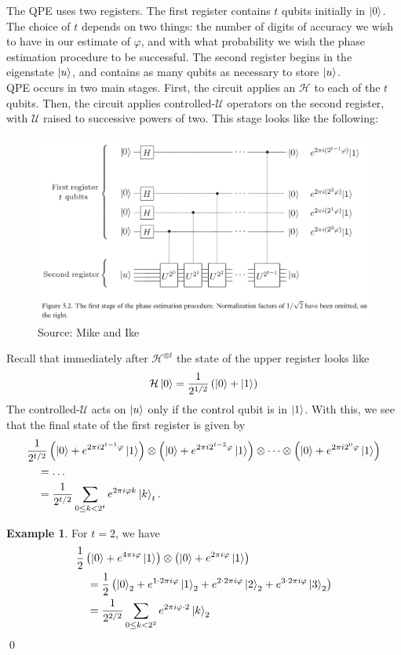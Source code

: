 \documentclass{book}
\theoremstyle{definition}
\newtheorem{exmp}{Example}[section]
\newcommand{\nn}{\nonumber}
\newcommand{\had}{\mathcal{H}}
\newcommand{\f}[2]{\frac{#1}{#2}}
\newcommand{\lp}{\left(}
\newcommand{\rp}{\right)}
\newcommand{\U}{\mathcal{U}}
\begin{document}
The QPE uses two registers. The first register contains $t$ qubits initially in $\ket{0}$. The choice of $t$ depends on two things: the number of digits of accuracy we wish to have in our estimate of $\varphi$, and with what probability we wish the phase estimation procedure to be successful. The second register begins in the eigenstate $\ket{u}$, and contains as many qubits as necessary to store $\ket{u}$. \\

QPE occurs in two main stages. First, the circuit applies  an $\had$ to each of the $t$ qubits. Then, the circuit applies controlled-$\U$ operators on the second register, with $\U$ raised to successive powers of two. This stage looks like the following:
\begin{figure}[!htb]
	\centering
	\includegraphics[scale=0.25]{qpe1}
	\caption{Source: Mike and Ike}
\end{figure} 
Recall that immediately after $\had^{\otimes t}$ the state of the upper register looks like
\begin{align}
\had \ket{0} = \f{1}{2^{1/2}}\lp \ket{0} + \ket{1} \rp
\end{align}
The controlled-$\U$ acts on $\ket{u}$ only if the control qubit is in $\ket{1}$. With this, we see that the final state of the first register is given by
\begin{align}
&\f{1}{2^{t/2}}\lp \ket{0} + e^{2\pi i 2^{t-1}\varphi}\ket{1} \rp\otimes
\lp \ket{0} + e^{2\pi i 2^{t-2}\varphi}\ket{1} \rp \otimes \dots \otimes \lp \ket{0} + e^{2\pi i 2^{0}\varphi}\ket{1} \rp\nn\\
&\quad = \dots \nn\\
&\quad = \f{1}{2^{t/2}}\sum_{0\leq k < 2^{t}} e^{2\pi i \varphi k}\ket{k}_t.
\end{align}

\begin{exmp}
For $t =2$, we have
\begin{align}
&\f{1}{2}\lp \ket{0} + e^{4\pi i \varphi } \ket{1} \rp\otimes \lp \ket{0} + e^{2\pi i\varphi }\ket{1} \rp \nn\\
&\quad= \f{1}{2}\lp \ket{0}_2 + e^{1\cdot 2\pi i\varphi }\ket{1}_2 + e^{2\cdot 2\pi i\varphi}\ket{2}_2 + e^{3\cdot 2\pi i\varphi }\ket{3}_2  \rp\nn\\
&\quad = \f{1}{2^{2/2}}\sum_{0 \leq k < 2^{2}}e^{2\pi i \varphi \cdot 2}\ket{k}_2
\end{align}\qed
\end{exmp}
\end{document}
